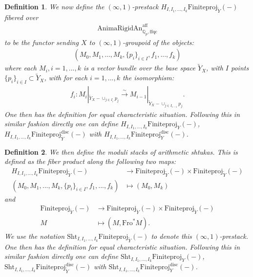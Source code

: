 \documentclass[12pt]{article}
\newtheorem{definition}{Definition}
\begin{document}
\begin{definition}
We now define the $(\infty,1)$-prestack $H_{I,I_1,...,I_k}\mathrm{Finiteproj}_{\widetilde{Y}}(-)$ fibered over 
\begin{align}
\mathrm{AnimaRigidAn}^\mathrm{aff}_{\mathbb{Q}_p,\mathrm{ffqc}} 
\end{align}
to be the functor sending $X$ to $(\infty,1)$-groupoid of the objects:
\begin{align}
(M_0,M_1,...,M_k, \{p_i\}_{i\in I}, f_1,...,f_k)	
\end{align}
where each $M_i,i=1,...,k$ is a vector bundle over the base space $\widetilde{Y}_X$, with $I$ points $\{p_i\}_{i\in I}\subset \widetilde{Y}_X$, with for each $i=1,...,k$ the isomorphism:
\begin{align}
f_i: M_i|_{\widetilde{Y}_X-\cup_{j\in I_i}p_j}	\overset{\sim}{\longrightarrow} M_{i-1}|_{\widetilde{Y}_X-\cup_{j\in I_{i-1}}p_j}.
\end{align}
One then has the definition for equal characteristic situation. Following this in similar fashion directly one can define $H_{I,I_1,...,I_k}\mathrm{Finiteproj}_{{Y}}(-)$, $H_{I,I_1,...,I_k}\mathrm{Finiteproj}^\mathrm{disc}_{\widetilde{Y}}(-)$ with $H_{I,I_1,...,I_k}\mathrm{Finiteproj}^\mathrm{disc}_{Y}(-)$.
\end{definition}


\begin{definition}
We then define the moduli stacks of arithmetic shtukas. This is defined as the fiber product along the following two maps:
\begin{align}
H_{I,I_1,...,I_k}\mathrm{Finiteproj}_{\widetilde{Y}}(-)&\rightarrow \mathrm{Finiteproj}_{\widetilde{Y}}(-)\times \mathrm{Finiteproj}_{\widetilde{Y}}(-)	\\
(M_0,M_1,...,M_k, \{p_i\}_{i\in I}, f_1,...,f_k)&\mapsto(M_0,M_k)
\end{align}
and
\begin{align}
\mathrm{Finiteproj}_{\widetilde{Y}}(-)&\rightarrow \mathrm{Finiteproj}_{\widetilde{Y}}(-)\times \mathrm{Finiteproj}_{\widetilde{Y}}(-)\\
M&\mapsto (M, \mathrm{Fro}^{*}M).	
\end{align}
We use the notation $\mathrm{Sht}_{I,I_1,...,I_k}\mathrm{Finiteproj}_{\widetilde{Y}}(-)$ to denote this $(\infty,1)$-prestack. One then has the definition for equal characteristic situation. Following this in similar fashion directly one can define $\mathrm{Sht}_{I,I_1,...,I_k}\mathrm{Finiteproj}_{{Y}}(-)$, $\mathrm{Sht}_{I,I_1,...,I_k}\mathrm{Finiteproj}^\mathrm{disc}_{\widetilde{Y}}(-)$ with $\mathrm{Sht}_{I,I_1,...,I_k}\mathrm{Finiteproj}^\mathrm{disc}_{Y}(-)$.
\end{definition}
\end{document}
